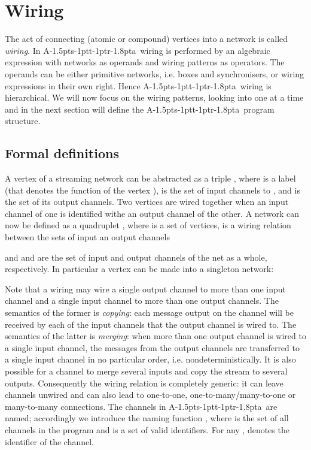 \documentclass[11pt]{report}
\def\ak{{\textsf{A\kern-1.5pts\kern-1ptt\kern-1ptr\kern-1.8pta}}\kern-2pt{\it K\kern-2ptahn}}
\begin{document}
\section{Wiring\label{sec:wiring}}

The act of connecting (atomic or compound) vertices into a network is called {\em wiring}. In \ak\ wiring is performed by an algebraic expression
with networks as operands and wiring patterns as operators. The operands can be either primitive networks, i.e. boxes
and synchronisers, or wiring expressions in their own right. Hence \ak\ wiring is hierarchical. We will now focus on
the wiring patterns, looking into one at a time and in the next section will define the \ak\ program structure.


\subsection{Formal definitions}

A vertex of a streaming network can be abstracted as a triple , where  is a label (that denotes
the function of the vertex ),  is the set of input channels to , and  is the set of its output channels.
Two vertices are wired together when an input channel of one is identified withe an output channel of the other.
A network  can now be defined as a quadruplet ,
where  is a set of vertices,  is a wiring relation
between the sets of input an output channels

and
 and  are the set of input and output channels of the net as a whole, respectively.
In particular a vertex can be made into a singleton network: 

Note that a wiring may wire a single output channel to more than one input channel
and a single input channel to more than one output channels. The semantics of the former is {\em copying}: each message output on the channel will be received by each of the input channels that the output channel is wired to. The semantics of the latter is {\em merging}: when more than one output channel is wired to a single input channel, the messages from the output channels are transferred to a single input channel in no particular order, i.e. nondeterministically. It is also possible for a channel to merge several inputs and copy the stream to several outputs. Consequently the wiring relation is completely generic: it can leave channels unwired and can also lead to one-to-one, one-to-many/many-to-one or many-to-many connections.  The channels in \ak\ are named; accordingly we introduce the naming function , where  is the set of all channels in the program and  is a set of valid identifiers.
For any ,  denotes the identifier of the channel.
\end{document}
